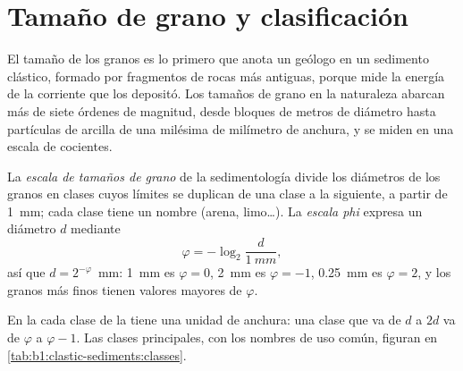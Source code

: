 \section{Tamaño de grano y clasificación}\label{sec:b1:clastic-sediments:grain-size}

El tamaño de los granos es lo primero que anota un geólogo en un sedimento clástico, formado por fragmentos de rocas más antiguas, porque mide la energía de la
corriente que los depositó. Los tamaños de grano en la naturaleza abarcan más de siete órdenes de magnitud, desde bloques de metros de diámetro hasta partículas de
arcilla de una milésima de milímetro de anchura, y se miden en una escala de cocientes.

\begin{definition}\label{def:b1:clastic-sediments:grain-size}
La \emph{escala de tamaños de grano} de la sedimentología divide los diámetros de los granos en clases cuyos límites se duplican de
una clase a la siguiente, a partir de \qty{1}{mm}; cada clase tiene un nombre (arena, limo\ldots). La \emph{escala phi} expresa un diámetro $d$ mediante
\[
  \varphi = -\log_2 \frac{d}{\qty{1}{mm}},
\]
así que $d = 2^{-\varphi}$~mm: \qty{1}{mm} es $\varphi = 0$, \qty{2}{mm} es
$\varphi = -1$, \qty{0.25}{mm} es $\varphi = 2$, y los granos más finos tienen valores
mayores de $\varphi$.
\end{definition}

En la  cada clase de la  tiene una unidad de anchura: una clase que va de $d$ a $2d$ va de $\varphi$ a $\varphi - 1$. Las clases
principales, con los nombres de uso común, figuran en \cref{tab:b1:clastic-sediments:classes}.

